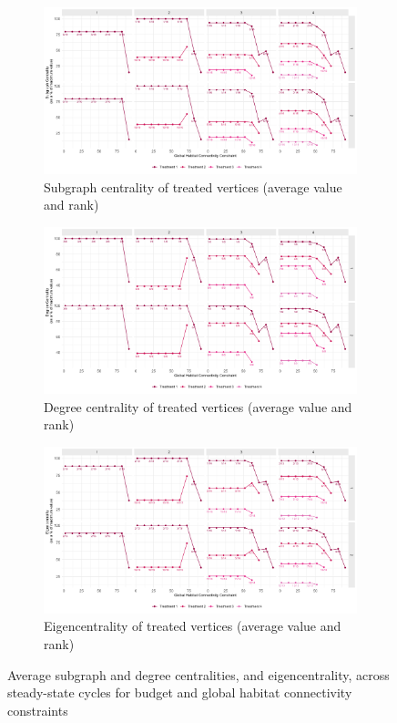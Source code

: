 \begin{figure}[h]
	\centering
	\begin{subfigure}[b]{\textwidth}
		\centering
	\includegraphics[width = .8\textwidth]{figures/wildland/subgraph_treatment.jpg}
	\caption{Subgraph centrality of treated vertices (average value and rank)}
	\label{fig:subgraph}
	\end{subfigure}
	
	\begin{subfigure}[b]{\textwidth}
	\centering
	\includegraphics[width = .8\textwidth]{figures/wildland/degree_treatment.jpg}
	\caption{Degree centrality of treated vertices (average value and rank)}
	\label{fig:degree}
	\end{subfigure}

	\begin{subfigure}[b]{\textwidth}
	\centering
	\includegraphics[width = .8\textwidth]{figures/wildland/eigencentrality_treatment.jpg}
	\caption{Eigencentrality of treated vertices (average value and rank)}
	\label{fig:eigen}
	\end{subfigure}
	\caption{Average subgraph and degree centralities, and eigencentrality, across steady-state cycles for budget and global habitat connectivity constraints}
\end{figure}
\clearpage


